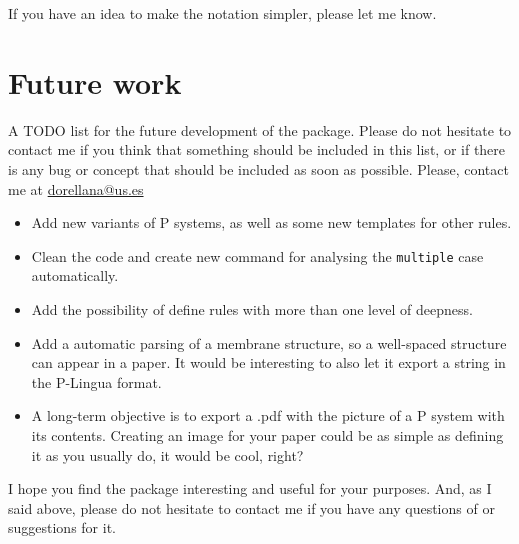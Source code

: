 \documentclass{article}
\begin{document}
If you have an idea to make the notation simpler, please let me know.

\section{Future work}
\label{sec:future-work}

A TODO list for the future development of the package. Please do not
hesitate to contact me if you think that something should be included
in this list, or if there is any bug or concept that should be
included as soon as possible. Please, contact me at
\href{mailto:dorellana@us.es}{dorellana@us.es}

\begin{itemize}
\item Add new variants of P systems, as well as some new templates for
  other rules.
\item Clean the code and create new command for analysing the
  \texttt{multiple} case automatically.
\item Add the possibility of define rules with more than one level of
  deepness.
\item Add a automatic parsing of a membrane structure, so a
  well-spaced structure can appear in a paper. It would be interesting
  to also let it export a string in the P-Lingua format.
\item A long-term objective is to export a .pdf with the picture of a
  P system with its contents. Creating an image for your paper could
  be as simple as defining it as you usually do, it would be cool, right?
\end{itemize}

I hope you find the package interesting and useful for your
purposes. And, as I said above, please do not hesitate to contact me
if you have any questions of or suggestions for it.
\end{document}
